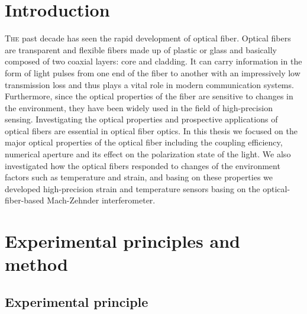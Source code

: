 \documentclass[10pt,a4paper,twocolumn,twoside,UTF8]{article}
\begin{document}
\renewcommand{\thefootnote}{\fnsymbol{footnote}}

\thispagestyle{firstpage} 
\pagestyle{maincontent}

\section{Introduction}
\lettrine[lines=2]{T}{he} past decade has seen the rapid development of optical fiber. 
Optical fibers are transparent and flexible fibers made up of plastic or glass and basically composed of two coaxial layers: core and cladding. 
It can carry information in the form of light pulses from one end of the fiber to another with an impressively low transmission loss and thus plays a vital role in modern communication systems. 
Furthermore, since the optical properties of the fiber are sensitive to changes in the environment, they have been widely used in the field of high-precision sensing. 
Investigating the optical properties and prospective applications of optical fibers are essential in optical fiber optics. 
In this thesis we focused on the major optical properties of the optical fiber including the coupling efficiency, numerical aperture and its effect on the polarization state of the light. 
We also investigated how the optical fibers responded to changes of the environment factors such as temperature and strain, and basing on these properties we developed high-precision strain and temperature sensors basing on the optical-fiber-based Mach-Zehnder interferometer.

\section{Experimental principles and method}
	\subsection{Experimental principle\autocite{shenGeneralPhysicsLaboratory2015}}
\end{document}
